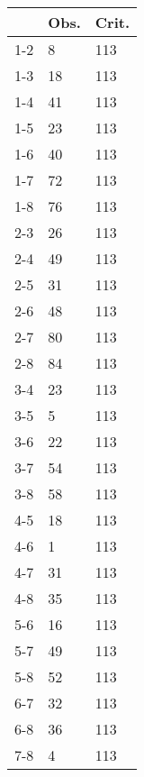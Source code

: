 \begin{table}[ht]
\centering
\begin{tabular}{rll}
  \hline
 & Obs. & Crit. \\ 
  \hline
1-2 & 8 & 113 \\ 
  1-3 & 18 & 113 \\ 
  1-4 & 41 & 113 \\ 
  1-5 & 23 & 113 \\ 
  1-6 & 40 & 113 \\ 
  1-7 & 72 & 113 \\ 
  1-8 & 76 & 113 \\ 
  2-3 & 26 & 113 \\ 
  2-4 & 49 & 113 \\ 
  2-5 & 31 & 113 \\ 
  2-6 & 48 & 113 \\ 
  2-7 & 80 & 113 \\ 
  2-8 & 84 & 113 \\ 
  3-4 & 23 & 113 \\ 
  3-5 & 5 & 113 \\ 
  3-6 & 22 & 113 \\ 
  3-7 & 54 & 113 \\ 
  3-8 & 58 & 113 \\ 
  4-5 & 18 & 113 \\ 
  4-6 & 1 & 113 \\ 
  4-7 & 31 & 113 \\ 
  4-8 & 35 & 113 \\ 
  5-6 & 16 & 113 \\ 
  5-7 & 49 & 113 \\ 
  5-8 & 52 & 113 \\ 
  6-7 & 32 & 113 \\ 
  6-8 & 36 & 113 \\ 
  7-8 & 4 & 113 \\ 
   \hline
\end{tabular}
\end{table}

